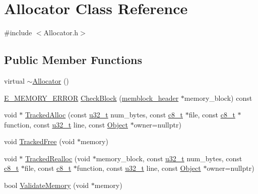 \section{Allocator Class Reference}
\label{class_allocator}


{\ttfamily \#include $<$Allocator.\-h$>$}

\subsection*{Public Member Functions}
\begin{DoxyCompactItemize}
\item 
virtual \hyperlink{class_allocator_ae6af139c96381e0c00dc82d291669577}{$\sim$\-Allocator} ()
\item 
\hyperlink{_allocator_8h_adc7040deea27628dba424c534b71dbbf}{E\-\_\-\-M\-E\-M\-O\-R\-Y\-\_\-\-E\-R\-R\-O\-R} \hyperlink{class_allocator_ad1c15835d7b080beb8c56b21e0014553}{Check\-Block} (\hyperlink{structmemblock__header}{memblock\-\_\-header} $\ast$memory\-\_\-block) const 
\item 
void $\ast$ \hyperlink{class_allocator_a17c7ab1b99c5c4d6860af66f34002d1f}{Tracked\-Alloc} (const \hyperlink{types_8h_a0c0a490ab7fa397be6c764a935cc5ea4}{u32\-\_\-t} num\-\_\-bytes, const \hyperlink{types_8h_a93d4fa6fb79d31926edb1d51e2f502d2}{c8\-\_\-t} $\ast$file, const \hyperlink{types_8h_a93d4fa6fb79d31926edb1d51e2f502d2}{c8\-\_\-t} $\ast$function, const \hyperlink{types_8h_a0c0a490ab7fa397be6c764a935cc5ea4}{u32\-\_\-t} line, const \hyperlink{class_object}{Object} $\ast$owner=nullptr)
\item 
void \hyperlink{class_allocator_ae88ef2e17cf916e2efdf96280adca9fb}{Tracked\-Free} (void $\ast$memory)
\item 
void $\ast$ \hyperlink{class_allocator_a73c073a5655a9d690ae092451fd65b2d}{Tracked\-Realloc} (void $\ast$memory\-\_\-block, const \hyperlink{types_8h_a0c0a490ab7fa397be6c764a935cc5ea4}{u32\-\_\-t} num\-\_\-bytes, const \hyperlink{types_8h_a93d4fa6fb79d31926edb1d51e2f502d2}{c8\-\_\-t} $\ast$file, const \hyperlink{types_8h_a93d4fa6fb79d31926edb1d51e2f502d2}{c8\-\_\-t} $\ast$function, const \hyperlink{types_8h_a0c0a490ab7fa397be6c764a935cc5ea4}{u32\-\_\-t} line, const \hyperlink{class_object}{Object} $\ast$owner=nullptr)
\item 
bool \hyperlink{class_allocator_a75eb91f24cd96d106d9f9559e2a2b2e1}{Validate\-Memory} (void $\ast$memory)
\end{DoxyCompactItemize}
